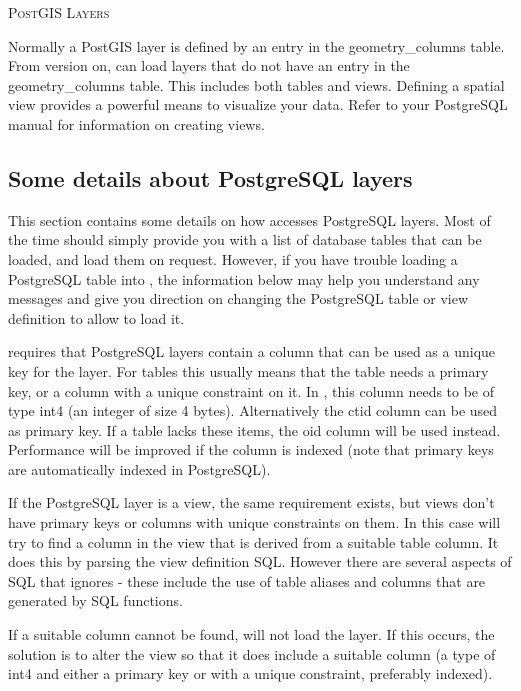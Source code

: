 \begin{Tip}\caption{\textsc{PostGIS Layers}}
Normally a PostGIS layer is defined by an entry in the
geometry\_columns table. From version \OLD %
on, \qg can load layers that do not have
an entry in the geometry\_columns table. This includes both tables and views.
Defining a spatial view provides a powerful means to visualize your data. Refer
to your PostgreSQL manual for information on creating views.
\end{Tip}

\subsection{Some details about PostgreSQL
layers}\label{sec:postgis_details}

This section contains some details on how \qg accesses PostgreSQL
layers. Most of the time \qg should simply provide you with a list of
database tables that can be loaded, and load them on request. However,
if you have trouble loading a PostgreSQL table into \qg, the information
below may help you understand any \qg messages and give you direction on
changing the PostgreSQL table or view definition to allow \qg to load it.

\qg requires that PostgreSQL layers contain a column that can be
used as a unique key for the layer. For tables this usually means
that the table needs a primary key, or a column with a unique
constraint on it. In \qg, this column needs to be of
type int4 (an integer of size 4 bytes). Alternatively the ctid column can be
used as primary key. If a table lacks these items,
the oid column will be used instead. Performance will be improved if the
column is indexed (note that primary keys are automatically indexed in
PostgreSQL).

If the PostgreSQL layer is a view, the same requirement exists, but
views don't have primary keys or columns with unique constraints on
them. In this case \qg will try to find a column in the view that is
derived from a suitable table column. It does this by parsing the view
definition SQL. However there are several aspects of SQL that \qg ignores
- these include the use of table aliases and columns that are generated by
SQL functions.

If a suitable column cannot be found, \qg will not load the layer. If this
occurs, the solution is to alter the view so that it does include a suitable
column (a type of int4 and either a primary key or with a unique constraint,
preferably indexed).

